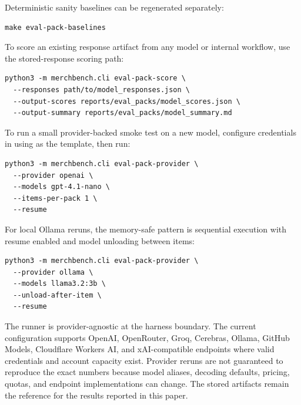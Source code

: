 \documentclass[11pt]{article}
\begin{document}
Deterministic sanity baselines can be regenerated separately:

\begin{verbatim}
make eval-pack-baselines
\end{verbatim}

To score an existing response artifact from any model or internal workflow, use the stored-response scoring path:

\begin{verbatim}
python3 -m merchbench.cli eval-pack-score \
  --responses path/to/model_responses.json \
  --output-scores reports/eval_packs/model_scores.json \
  --output-summary reports/eval_packs/model_summary.md
\end{verbatim}

To run a small provider-backed smoke test on a new model, configure credentials in  using  as the template, then run:

\begin{verbatim}
python3 -m merchbench.cli eval-pack-provider \
  --provider openai \
  --models gpt-4.1-nano \
  --items-per-pack 1 \
  --resume
\end{verbatim}

For local Ollama reruns, the memory-safe pattern is sequential execution with resume enabled and model unloading between items:

\begin{verbatim}
python3 -m merchbench.cli eval-pack-provider \
  --provider ollama \
  --models llama3.2:3b \
  --unload-after-item \
  --resume
\end{verbatim}

The runner is provider-agnostic at the harness boundary. The current configuration supports OpenAI, OpenRouter, Groq, Cerebras, Ollama, GitHub Models, Cloudflare Workers AI, and xAI-compatible endpoints where valid credentials and account capacity exist. Provider reruns are not guaranteed to reproduce the exact numbers because model aliases, decoding defaults, pricing, quotas, and endpoint implementations can change. The stored artifacts remain the reference for the results reported in this paper.
\end{document}
